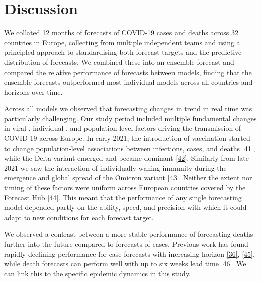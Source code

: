 \documentclass[
]{article}
\begin{document}
\hypertarget{discussion}{%
\section{Discussion}\label{discussion}}

We collated 12 months of forecasts of COVID-19 cases and deaths across 32 countries in Europe, collecting from multiple independent teams and using a principled approach to standardising both forecast targets and the predictive distribution of forecasts. We combined these into an ensemble forecast and compared the relative performance of forecasts between models, finding that the ensemble forecasts outperformed most individual models across all countries and horizons over time.

Across all models we observed that forecasting changes in trend in real time was particularly challenging. Our study period included multiple fundamental changes in viral-, individual-, and population-level factors driving the transmission of COVID-19 across Europe. In early 2021, the introduction of vaccination started to change population-level associations between infections, cases, and deaths \protect\hyperlink{ref-europeancentrefordiseasepreventionandcontrolInterimGuidanceBenefits2021}{{[}41{]}}, while the Delta variant emerged and became dominant \protect\hyperlink{ref-europeancentrefordiseasepreventionandcontrolThreatAssessmentBrief2021}{{[}42{]}}. Similarly from late 2021 we saw the interaction of individually waning immunity during the emergence and global spread of the Omicron variant \protect\hyperlink{ref-europeancentrefordiseasepreventionandcontrolAssessmentFurtherSpread2022}{{[}43{]}}. Neither the extent nor timing of these factors were uniform across European countries covered by the Forecast Hub \protect\hyperlink{ref-europeancentrefordiseasepreventionandcontrolOverviewImplementationCOVID192021}{{[}44{]}}. This meant that the performance of any single forecasting model depended partly on the ability, speed, and precision with which it could adapt to new conditions for each forecast target.

We observed a contrast between a more stable performance of forecasting deaths further into the future compared to forecasts of cases. Previous work has found rapidly declining performance for case forecasts with increasing horizon \protect\hyperlink{ref-cramerEvaluationIndividualEnsemble2021}{{[}36{]}}, \protect\hyperlink{ref-castroTurningPointEnd2020}{{[}45{]}}, while death forecasts can perform well with up to six weeks lead time \protect\hyperlink{ref-friedmanPredictivePerformanceInternational2021}{{[}46{]}}. We can link this to the specific epidemic dynamics in this study.
\end{document}

